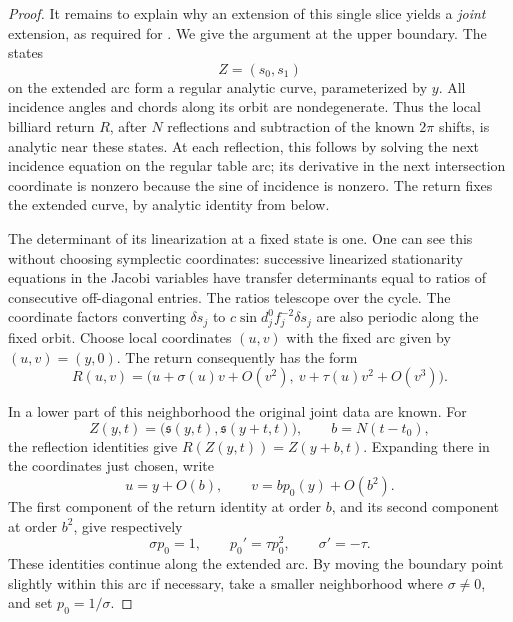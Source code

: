 \begin{proof}
It remains to explain why an extension of this single slice yields a
\emph{joint} extension, as required for .  We give the
argument at the upper boundary.  The states
\[
 Z=(s_0,s_1)
\]
on the extended arc form a regular analytic curve, parameterized by \(y\).
All incidence angles and chords along its orbit are nondegenerate.  Thus
the local billiard return \(R\), after \(N\) reflections and subtraction
of the known \(2\pi\) shifts, is analytic near these states.  At each
reflection, this follows by solving the next incidence equation on the
regular table arc; its derivative in the next intersection coordinate is
nonzero because the sine of incidence is nonzero.  The return fixes the
extended curve, by analytic identity from below.

The determinant of its linearization at a fixed state is one.  One can
see this without choosing symplectic coordinates: successive linearized
stationarity equations in the Jacobi variables have transfer determinants
equal to ratios of consecutive off-diagonal entries.  The ratios telescope
over the cycle.  The coordinate factors converting \(\delta s_j\) to
\(c\sin d_j^0 f_j^{-2}\delta s_j\) are also periodic along the fixed orbit.
Choose local coordinates \((u,v)\) with the fixed arc given by
\((u,v)=(y,0)\).  The return consequently has the form
\begin{equation}
 R(u,v)=
 \bigl(u+\sigma(u)v+O(v^2),\ v+\tau(u)v^2+O(v^3)\bigr).
 \label{odd:return-expansion}
\end{equation}

In a lower part of this neighborhood the original joint data are known.
For
\[
 Z(y,t)=\bigl(\mathfrak s(y,t),\mathfrak s(y+t,t)\bigr),
 \qquad b=N(t-t_0),
\]
the reflection identities give
\(R(Z(y,t))=Z(y+b,t)\).  Expanding there in the coordinates just chosen,
write
\[
 u=y+O(b),\qquad v=b p_0(y)+O(b^2).
\]
The first component of the return identity at order \(b\), and its second
component at order \(b^2\), give respectively
\begin{equation}
 \sigma p_0=1,\qquad p_0'=\tau p_0^2,
 \qquad \sigma'=-\tau.
 \label{odd:return-compatibility}
\end{equation}
These identities continue along the extended arc.  By moving the boundary
point slightly within this arc if necessary, take a smaller neighborhood
where \(\sigma\ne0\), and set \(p_0=1/\sigma\).


\end{proof}

